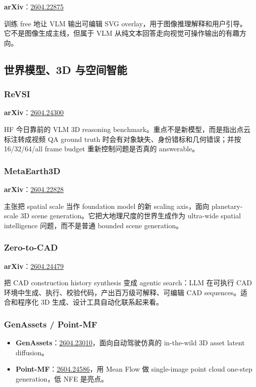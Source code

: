 \textbf{arXiv}：\href{https://arxiv.org/abs/2604.22875}{2604.22875}

训练 free 地让 VLM 输出可编辑 SVG overlay，用于图像推理解释和用户引导。它不是图像生成主线，但属于 VLM 从纯文本回答走向视觉可操作输出的有趣方向。

\subsection{世界模型、3D 与空间智能}

\subsubsection{ReVSI}

\textbf{arXiv}：\href{https://arxiv.org/abs/2604.24300}{2604.24300}

HF 今日靠前的 VLM 3D reasoning benchmark。重点不是新模型，而是指出点云标注转成视频 QA ground truth 时会有对象缺失、身份错标和几何错误；并按 16/32/64/all frame budget 重新控制问题是否真的 answerable。

\subsubsection{MetaEarth3D}

\textbf{arXiv}：\href{https://arxiv.org/abs/2604.22828}{2604.22828}

主张把 spatial scale 当作 foundation model 的新 scaling axis，面向 planetary-scale 3D scene generation。它把大地理尺度的世界生成作为 ultra-wide spatial intelligence 问题，而不是普通 bounded scene generation。

\subsubsection{Zero-to-CAD}

\textbf{arXiv}：\href{https://arxiv.org/abs/2604.24479}{2604.24479}

把 CAD construction history synthesis 变成 agentic search：LLM 在可执行 CAD 环境中生成、执行、校验代码，产出百万级可解释、可编辑 CAD sequences。适合和程序化 3D 生成、设计工具自动化联系起来看。

\subsubsection{GenAssets / Point-MF}

\begin{itemize}[leftmargin=1.5em]
  \item \textbf{GenAssets}：\href{https://arxiv.org/abs/2604.23010}{2604.23010}，面向自动驾驶仿真的 in-the-wild 3D asset latent diffusion。
  \item \textbf{Point-MF}：\href{https://arxiv.org/abs/2604.24586}{2604.24586}，用 Mean Flow 做 single-image point cloud one-step generation，低 NFE 是亮点。
\end{itemize}

